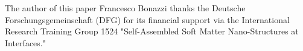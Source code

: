 The author of this paper Francesco Bonazzi thanks the Deutsche
Forschungsgemeinschaft (DFG) for its financial support via the International
Research Training Group 1524 "Self-Assembled Soft Matter Nano-Structures at
Interfaces."
